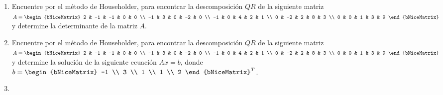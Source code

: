 \documentclass[
  spanish,
  8pt,
  utf8,
  xcolor=table,
  handout,
  aspectratio=169,
  professionalfonts,
  notheorems,
  mathserif,
]{beamer}
\newcounter{savedenum}
\newcommand*{\resume}{\setcounter{enumi}{\thesavedenum}}
\begin{document}
\begin{frame}
	\begin{enumerate}
		\resume

		\item

		      Encuentre por el método de Householder, para encontrar la
		      descomposición $QR$ de la siguiente matriz
		      \begin{math}
			      A=
			      \begin{bNiceMatrix}
				      2  & -1 & -1 & 0  & 0 \\
				      -1 & 3  & 0  & -2 & 0 \\
				      -1 & 0  & 4  & 2  & 1 \\
				      0  & -2 & 2  & 8  & 3 \\
				      0  & 0  & 1  & 3  & 9
			      \end{bNiceMatrix}
		      \end{math}
		      y determine la determinante de la matriz $A$.

		\item

		      Encuentre por el método de Householder, para encontrar la
		      descomposición $QR$ de la siguiente matriz
		      \begin{math}
			      A=
			      \begin{bNiceMatrix}
				      2  & -1 & -1 & 0  & 0 \\
				      -1 & 3  & 0  & -2 & 0 \\
				      -1 & 0  & 4  & 2  & 1 \\
				      0  & -2 & 2  & 8  & 3 \\
				      0  & 0  & 1  & 3  & 9
			      \end{bNiceMatrix}
		      \end{math}
		      y determine la solución de la siguiente ecuación $Ax=b$,
		      donde
		      \begin{math}
			      b=
			      {\begin{bNiceMatrix}
				      -1 \\
				      3  \\
				      1  \\
				      1  \\
				      2
			      \end{bNiceMatrix}}^{T}
		      \end{math}.

		\item


\end{enumerate}
\end{frame}
\end{document}

